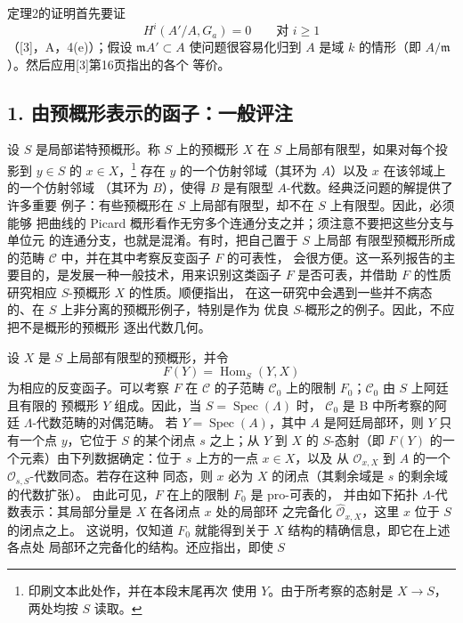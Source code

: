 定理2的证明首先要证
\[
  H^i(A'/A,G_a)=0\qquad\text{对 }i\geq 1
\]
（[3]，A，4(e)）；假设 $\mathfrak mA'\subset A$ 使问题很容易化归到
$A$ 是域 $k$ 的情形（即 $A/\mathfrak m$）。然后应用[3]第16页指出的各个
等价。


\subsection*{1. 由预概形表示的函子：一般评注}

设 $S$ 是局部诺特预概形。称 $S$ 上的预概形 $X$
在 $S$ 上局部有限型，如果对每个投影到 $y\in S$ 的
$x\in X$，\footnote{印刷文本此处作，并在本段末尾再次
使用 $Y$。由于所考察的态射是 $X\longrightarrow S$，两处均按 $S$ 读取。}
存在 $y$ 的一个仿射邻域（其环为 $A$）以及 $x$ 在该邻域上的一个仿射邻域
（其环为 $B$），使得 $B$ 是有限型 $A$-代数。经典泛问题的解提供了许多重要
例子：有些预概形在 $S$ 上局部有限型，却不在 $S$ 上有限型。因此，必须能够
把曲线的 Picard 概形看作无穷多个连通分支之并；须注意不要把这些分支与单位元
的连通分支，也就是混淆。有时，把自己置于 $S$ 上局部
有限型预概形所成的范畴 $\mathcal C$ 中，并在其中考察反变函子 $F$ 的可表性，
会很方便。这一系列报告的主要目的，是发展一种一般技术，用来识别这类函子
$F$ 是否可表，并借助 $F$ 的性质研究相应 $S$-预概形 $X$ 的性质。顺便指出，
在这一研究中会遇到一些并不病态的、在 $S$ 上非分离的预概形例子，特别是作为
优良 $S$-概形之的例子。因此，不应把不是概形的预概形
逐出代数几何。

设 $X$ 是 $S$ 上局部有限型的预概形，并令
\[
  F(Y)=\operatorname{Hom}_S(Y,X)
\]
为相应的反变函子。可以考察 $F$ 在 $\mathcal C$ 的子范畴
$\mathcal C_0$ 上的限制 $F_0$；$\mathcal C_0$ 由 $S$ 上阿廷且有限的
预概形 $Y$ 组成。因此，当 $S=\operatorname{Spec}(\Lambda)$ 时，
$\mathcal C_0$ 是 B 中所考察的阿廷 $\Lambda$-代数范畴的对偶范畴。
若 $Y=\operatorname{Spec}(A)$，其中 $A$ 是阿廷局部环，则 $Y$ 只有一个点
$y$，它位于 $S$ 的某个闭点 $s$ 之上；从 $Y$ 到 $X$ 的 $S$-态射（即
$F(Y)$ 的一个元素）由下列数据确定：位于 $s$ 上方的一点 $x\in X$，以及
从 $\mathcal O_{x,X}$ 到 $A$ 的一个 $\mathcal O_{s,S}$-代数同态。若存在这种
同态，则 $x$ 必为 $X$ 的闭点（其剩余域是 $s$ 的剩余域的代数扩张）。
由此可见，$F$ 在上的限制 $F_0$ 是 pro-可表的，
并由如下拓扑 $\Lambda$-代数表示：其局部分量是 $X$ 在各闭点 $x$ 处的局部环
之完备化 $\widehat{\mathcal O}_{x,X}$，这里 $x$ 位于 $S$ 的闭点之上。
这说明，仅知道 $F_0$ 就能得到关于 $X$ 结构的精确信息，即它在上述各点处
局部环之完备化的结构。还应指出，即使 $S$

